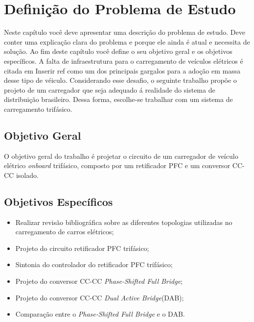 \chapter{Definição do Problema de Estudo}
Neste capítulo você deve apresentar uma descrição do problema de estudo.
Deve conter uma explicação clara do problema e porque ele ainda é atual e necessita de solução.
Ao fim deste capítulo você define o seu objetivo geral e os objetivos específicos. 
A falta de infraestrutura para o carregamento de veículos elétricos é citada em {Inserir ref} como
um dos principais gargalos para a adoção em massa desse tipo de véiculo. Considerando esse desafio,
o seguinte trabalho propõe o projeto de um carregador que seja adequado á realidade do sistema de distribuição
brasileiro. Dessa forma, escolhe-se trabalhar com um sistema de carregamento trifásico.


\section{Objetivo Geral}
O objetivo geral do trabalho é projetar o circuito de um carregador de veículo elétrico \textit{onboard} trifásico, composto por um retificador PFC e um conversor CC-CC isolado.
\section{Objetivos Específicos}
\begin{itemize}
    \item Realizar revisão bibliográfica sobre as diferentes topologias utilizadas no carregamento de carros elétricos;
    \item Projeto do circuito retificador PFC trifásico;
    \item Sintonia do controlador do retificador PFC trifásico;
    \item Projeto do conversor CC-CC \textit{Phase-Shifted Full Bridge};
    \item Projeto do conversor CC-CC \textit{Dual Active Bridge}(DAB);
    \item Comparação entre o \textit{Phase-Shifted Full Bridge} e o DAB.
\end{itemize}
